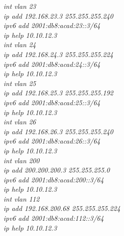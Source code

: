 \documentclass[12pt,a4paper]{report}
\begin{document}
\hspace*{2cm}\textit{int vlan 23\\
\hspace*{2cm}ip add 192.168.23.3 255.255.255.240\\
\hspace*{2cm}ipv6 add 2001:db8:acad:23::3/64\\
\hspace*{2cm}ip help 10.10.12.3\\
\hspace*{2cm}int vlan 24\\
\hspace*{2cm}ip add 192.168.24.3 255.255.255.224\\
\hspace*{2cm}ipv6 add 2001:db8:acad:24::3/64\\
\hspace*{2cm}ip help 10.10.12.3\\
\hspace*{2cm}int vlan 25\\
\hspace*{2cm}ip add 192.168.25.3 255.255.255.192\\
\hspace*{2cm}ipv6 add 2001:db8:acad:25::3/64\\
\hspace*{2cm}ip help 10.10.12.3\\
\hspace*{2cm}int vlan 26\\
\hspace*{2cm}ip add 192.168.26.3 255.255.255.240\\
\hspace*{2cm}ipv6 add 2001:db8:acad:26::3/64\\
\hspace*{2cm}ip help 10.10.12.3\\
\hspace*{2cm}int vlan 200\\
\hspace*{2cm}ip add 200.200.200.3 255.255.255.0\\
\hspace*{2cm}ipv6 add 2001:db8:acad:200::3/64\\
\hspace*{2cm}ip help 10.10.12.3\\
\hspace*{2cm}int vlan 112\\
\hspace*{2cm}ip add 192.168.200.68 255.255.255.224 \\
\hspace*{2cm}ipv6 add 2001:db8:acad:112::3/64\\
\hspace*{2cm}ip help 10.10.12.3\\}
\end{document}
